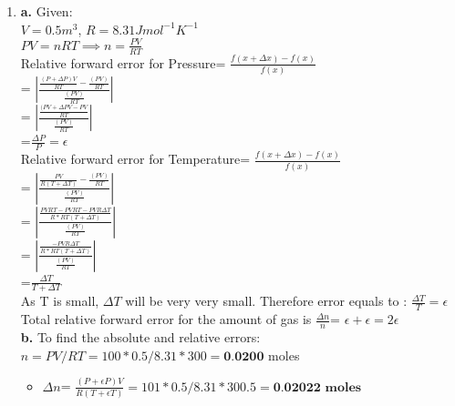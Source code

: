 \documentclass[12pt, oneside]{article}   	%
\begin{document}
\begin{enumerate}
\begin{enumerate}
	\end{enumerate}
	
	\newpage
	
	\item \textbf{ a.} Given:\\
	$V= 0.5m^3$,  $R= 8.31 J mol^{-1} K^{-1}$\\
	$PV=nRT \implies n=\frac{PV}{RT}$\\
	
	Relative forward error for Pressure= $\frac{f(x+\Delta x ) -f(x)} { f(x)}$   \\ 
	
	\hspace{6cm}= $|\frac{\frac{(P+\Delta P)V }{RT}-\frac{(PV) }{RT}} { \frac{(PV) }{RT}}|$  \\
	
		\hspace{6cm}= $|\frac{\frac{(PV+\Delta PV -PV }{RT} } { \frac{(PV) }{RT}}|$  \\
		
		\hspace{6cm}=$\frac{\Delta P}{P}= \epsilon$\\
			
		Relative forward error for Temperature= $\frac{f(x+\Delta x ) -f(x)} { f(x)}$   \\ 
			
		\hspace{7cm}= $|\frac{\frac{PV }{R(T+ \Delta T)}-\frac{(PV) }{RT}} { \frac{(PV) }{RT}}|$  \\
			
		\hspace{7cm}= $|\frac{\frac{PVRT -PVRT - PVR\Delta T}{R*RT(T+ \Delta T)}} { \frac{(PV) }{RT}}|$  \\
		
		\hspace{7cm}= $|\frac{\frac{- PVR\Delta T}{R*RT(T+ \Delta T)}} { \frac{(PV) }{RT}}|$  \\
				
		\hspace{7cm}=$\frac{\Delta T}{T + \Delta T}$\\
		
		As T is small, $\Delta T$ will be very very small. Therefore error equals to :
		$ \frac{\Delta T}{T }= \epsilon $\\
		Total relative forward error for the amount of gas is $\frac{\Delta n}{n} $= $\epsilon + \epsilon=2 \epsilon$\\
		
		\textbf{b.}   To find the absolute and relative errors:\\
			$	n= PV/RT=100 *0.5/ 8.31 *300 = \textbf{0.0200}$ moles\\	
		\begin{itemize}
			\item    	$\Delta n$= $\frac{(P+ \epsilon P) V}{R (T+ \epsilon T)}= 101* 0.5 / 8.31 * 300.5=\textbf{0.02022 moles}$\\
			

\end{itemize}
\end{enumerate}
\end{document}
